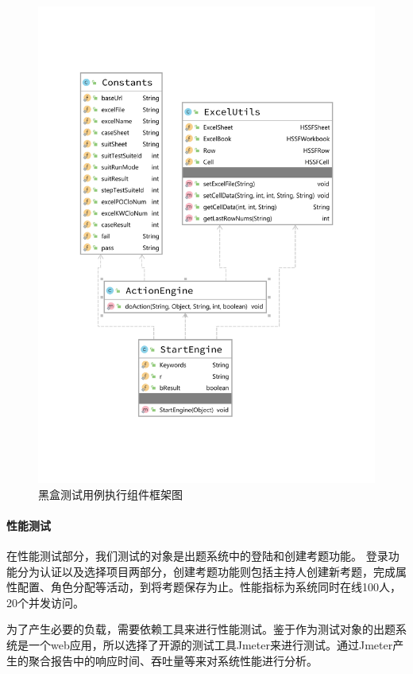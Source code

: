 \documentclass[hyperref, a4paper]{ctexart}
\let\oldparagraph\paragraph
\renewcommand{\paragraph}[1]{\oldparagraph{#1}\mbox{}}
\begin{document}
\begin{figure}
  \centering
  \includegraphics[scale=0.85]{./assets/ActionEngineDiagram.pdf}
  \caption{黑盒测试用例执行组件框架图}\label{4}
\end{figure}

\hypertarget{ux6027ux80fdux6d4bux8bd5}{%
\paragraph{性能测试}\label{ux6027ux80fdux6d4bux8bd5}}

在性能测试部分，我们测试的对象是出题系统中的登陆和创建考题功能。
登录功能分为认证以及选择项目两部分，创建考题功能则包括主持人创建新考题，完成属性配置、角色分配等活动，到将考题保存为止。性能指标为系统同时在线100人，20个并发访问。

为了产生必要的负载，需要依赖工具来进行性能测试。鉴于作为测试对象的出题系统是一个web应用，所以选择了开源的测试工具Jmeter来进行测试。通过Jmeter产生的聚合报告中的响应时间、吞吐量等来对系统性能进行分析。
\end{document}
